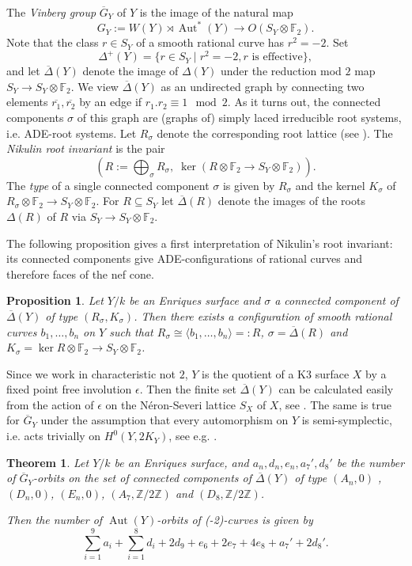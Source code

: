 \documentclass[a4paper]{amsart}
\theoremstyle{definition}
\theoremstyle{plain}
\newtheorem{theorem}[definition]{Theorem}
\newtheorem{proposition}[definition]{Proposition}
\DeclareMathOperator{\Aut}{Aut}
\newcommand{\FF}{\mathbb{F}}
\newcommand{\ZZ}{\mathbb{Z}}
\newcommand{\Gbar}{\overline{G}}
\newcommand{\DeltabarY}{\overline{\Delta}(Y)}
\begin{document}
The \emph{Vinberg group} $\overline{G}_Y$ of $Y$ is the image of the natural map
\[G_Y:=W(Y)\rtimes \Aut^*(Y) \to O(S_Y\otimes \FF_2).\]
Note that the class $r \in S_Y$ of a smooth rational curve has $r^2=-2$. 
Set 
\[\Delta^+(Y)=\{r \in S_Y \mid r^2=-2, r \mbox{ is effective}\},\]
and let $\DeltabarY$ denote the image of $\Delta(Y)$ under the reduction mod $2$ map $S_Y \to S_Y\otimes \FF_2$. 
We view $\DeltabarY$ as an undirected graph by connecting two elements $\overline{r_1},\overline{r_2}$ by an edge if $r_1.r_2 \equiv 1 \mod 2$.
As it turns out, the connected components $\sigma$ of this graph are (graphs of) simply laced irreducible root systems, i.e. ADE-root systems. Let $R_\sigma$ denote the corresponding root lattice (see ). The \emph{Nikulin root invariant} is the pair
\[\left(R:=\bigoplus_\sigma R_\sigma, \;\ker (R\otimes \FF_2 \to S_Y\otimes \FF_2)\right).\]
The \emph{type} of a single connected component $\sigma$ is given by $R_\sigma$ and the kernel $K_\sigma$ of $R_\sigma \otimes \FF_2 \to S_Y\otimes \FF_2$. For $R \subseteq S_Y$ let $\overline{\Delta}(R)$ denote the images of the roots $\Delta(R)$ of $R$ via $S_Y \to S_Y \otimes \FF_2$.

The following proposition gives a first interpretation of Nikulin's root invariant: its connected components give ADE-configurations of rational curves and therefore faces of the nef cone.
\begin{proposition}
    Let $Y/k$ be an Enriques surface and $\sigma$ a connected component of $\DeltabarY$ of type $(R_\sigma,K_\sigma)$. Then there exists a configuration of smooth rational curves $b_1,\dots, b_n$ on $Y$ such that $R_\sigma \cong\langle b_1, \dots, b_n \rangle=:R$, $\sigma = \overline{\Delta}(R)$ and $K_\sigma = \ker R \otimes \FF_2 \to S_Y\otimes \FF_2$.
\end{proposition}

Since we work in characteristic not $2$, $Y$ is the quotient of a K3 surface $X$ by a fixed point free involution $\epsilon$. Then the finite set $\DeltabarY$ can be calculated easily from the action of $\epsilon$ on the Néron-Severi lattice $S_X$ of $X$, see . 
The same is true for $\Gbar_Y$ under the assumption that every automorphism on $Y$ is semi-symplectic, i.e. acts trivially on $H^0(Y,2K_Y)$, see e.g. \cite[Theorem 3.9, Remarks 3.12, 3.13]{brandhorst-gonzalez:527}. 
\begin{theorem}\label{thm:main}
Let $Y/k$ be an Enriques surface, and $a_n,d_n,e_n,a_7',d_8'$ be the number of $\Gbar_Y$-orbits on the set of connected components of $\DeltabarY$ of type $(A_n,0)$ ,$(D_n, 0)$, $(E_n,0)$, $(A_7, \ZZ/2\ZZ)$ and $(D_8, \ZZ/2\ZZ)$. 

Then the number of $\Aut(Y)$-orbits of (-2)-curves is given by
\[\sum_{i=1}^9 a_i + \sum_{i=1}^8 d_i + 2 d_9 + e_6+2e_7+4e_8+a_7'+2d_8'.\]
\end{theorem}
\end{document}
